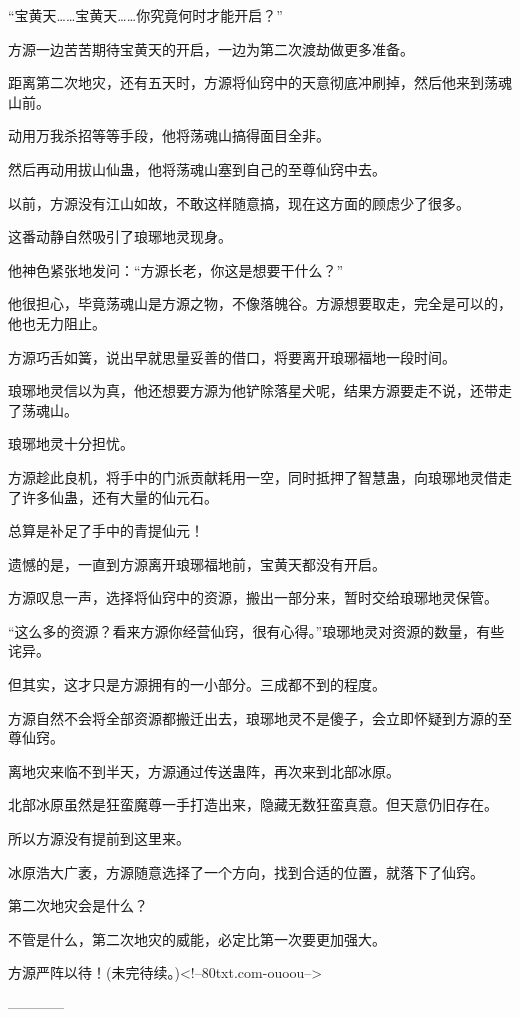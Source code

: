 \begin{this_body}
“宝黄天……宝黄天……你究竟何时才能开启？”

方源一边苦苦期待宝黄天的开启，一边为第二次渡劫做更多准备。

距离第二次地灾，还有五天时，方源将仙窍中的天意彻底冲刷掉，然后他来到荡魂山前。

动用万我杀招等等手段，他将荡魂山搞得面目全非。

然后再动用拔山仙蛊，他将荡魂山塞到自己的至尊仙窍中去。

以前，方源没有江山如故，不敢这样随意搞，现在这方面的顾虑少了很多。

这番动静自然吸引了琅琊地灵现身。

他神色紧张地发问：“方源长老，你这是想要干什么？”

他很担心，毕竟荡魂山是方源之物，不像落魄谷。方源想要取走，完全是可以的，他也无力阻止。

方源巧舌如簧，说出早就思量妥善的借口，将要离开琅琊福地一段时间。

琅琊地灵信以为真，他还想要方源为他铲除落星犬呢，结果方源要走不说，还带走了荡魂山。

琅琊地灵十分担忧。

方源趁此良机，将手中的门派贡献耗用一空，同时抵押了智慧蛊，向琅琊地灵借走了许多仙蛊，还有大量的仙元石。

总算是补足了手中的青提仙元！

遗憾的是，一直到方源离开琅琊福地前，宝黄天都没有开启。

方源叹息一声，选择将仙窍中的资源，搬出一部分来，暂时交给琅琊地灵保管。

“这么多的资源？看来方源你经营仙窍，很有心得。”琅琊地灵对资源的数量，有些诧异。

但其实，这才只是方源拥有的一小部分。三成都不到的程度。

方源自然不会将全部资源都搬迁出去，琅琊地灵不是傻子，会立即怀疑到方源的至尊仙窍。

离地灾来临不到半天，方源通过传送蛊阵，再次来到北部冰原。

北部冰原虽然是狂蛮魔尊一手打造出来，隐藏无数狂蛮真意。但天意仍旧存在。

所以方源没有提前到这里来。

冰原浩大广袤，方源随意选择了一个方向，找到合适的位置，就落下了仙窍。

第二次地灾会是什么？

不管是什么，第二次地灾的威能，必定比第一次要更加强大。

方源严阵以待！(未完待续。)<!--80txt.com-ouoou-->

------------

\end{this_body}

